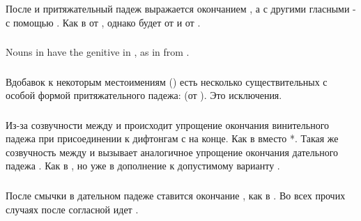 \label{morph:decl:pseudovowel}

\subsubsection{} После  и  притяжательный падеж выражается окончанием
, а с другими гласными - с помощью .  Как в 
от , однако будет  от  и 
от .

\subsubsection{} Nouns in  have the genitive in , as in
 from .

\subsubsection{} Вдобавок к некоторым местоимениям
() есть несколько существительных с особой формой притяжательного падежа:  (от ).  Это исключения.

\subsubsection{} Из-за созвучности между  и
 происходит упрощение окончания винительного падежа  при присоединении к дифтонгам с  на конце. Как в   вместо *. Такая же созвучность между  и
 вызывает аналогичное упрощение окончания дательного падежа . Как в  , но уже в дополнение к допустимому варианту .

\subsubsection{} После смычки в дательном падеже ставится окончание , как в .  Во всех прочих случаях после согласной идет .

